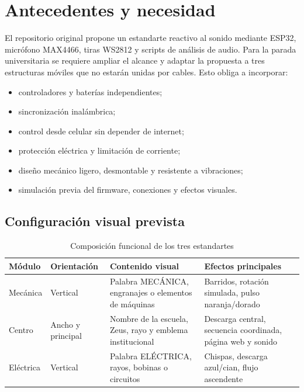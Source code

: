 \documentclass[11pt,a4paper]{article}
\begin{document}
\section{Antecedentes y necesidad}
El repositorio original propone un estandarte reactivo al sonido mediante ESP32, micrófono MAX4466, tiras WS2812 y scripts de análisis de audio. Para la parada universitaria se requiere ampliar el alcance y adaptar la propuesta a tres estructuras móviles que no estarán unidas por cables. Esto obliga a incorporar:
\begin{itemize}
  \item controladores y baterías independientes;
  \item sincronización inalámbrica;
  \item control desde celular sin depender de internet;
  \item protección eléctrica y limitación de corriente;
  \item diseño mecánico ligero, desmontable y resistente a vibraciones;
  \item simulación previa del firmware, conexiones y efectos visuales.
\end{itemize}

\subsection{Configuración visual prevista}
\begin{table}[H]
\centering
\caption{Composición funcional de los tres estandartes}
\begin{tabularx}{\textwidth}{@{}P{3.0cm}P{3.0cm}Y P{3.4cm}@{}}
\toprule
\textbf{Módulo} & \textbf{Orientación} & \textbf{Contenido visual} & \textbf{Efectos principales}\\
\midrule
Mecánica & Vertical & Palabra MECÁNICA, engranajes o elementos de máquinas & Barridos, rotación simulada, pulso naranja/dorado\\
Centro & Ancho y principal & Nombre de la escuela, Zeus, rayo y emblema institucional & Descarga central, secuencia coordinada, página web y sonido\\
Eléctrica & Vertical & Palabra ELÉCTRICA, rayos, bobinas o circuitos & Chispas, descarga azul/cian, flujo ascendente\\
\bottomrule
\end{tabularx}
\end{table}

\end{document}
